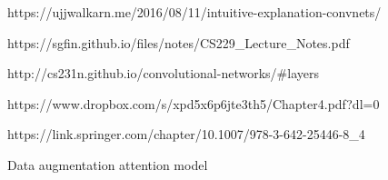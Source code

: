 https://ujjwalkarn.me/2016/08/11/intuitive-explanation-convnets/

https://sgfin.github.io/files/notes/CS229_Lecture_Notes.pdf

http://cs231n.github.io/convolutional-networks/#layers

https://www.dropbox.com/s/xpd5x6p6jte3th5/Chapter4.pdf?dl=0

https://link.springer.com/chapter/10.1007/978-3-642-25446-8_4


Data augmentation
attention model
